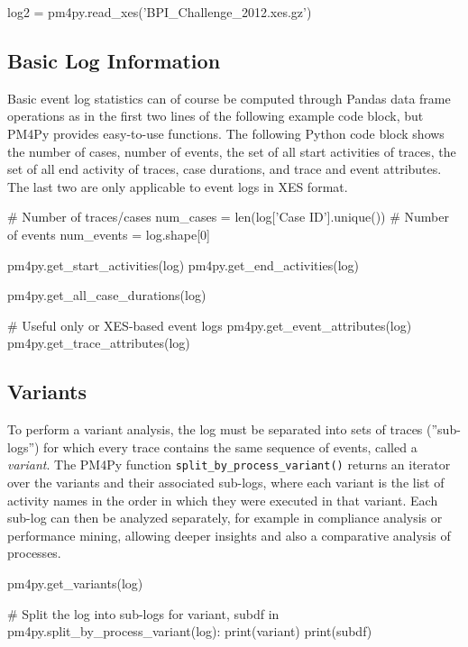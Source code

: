\begin{pythoncode}
log2 = pm4py.read_xes('BPI_Challenge_2012.xes.gz')
\end{pythoncode}

\subsection*{Basic Log Information}

Basic event log statistics can of course be computed through Pandas data frame operations as in the first two lines of the following example code block, but PM4Py provides easy-to-use functions. The following Python code block shows the number of cases, number of events, the set of all start activities of traces, the set of all end activity of traces, case durations, and trace and event attributes. The last two are only applicable to event logs in XES format.

\begin{samepage}
\begin{pythoncode}
# Number of traces/cases
num_cases = len(log['Case ID'].unique())
# Number of events
num_events = log.shape[0]

pm4py.get_start_activities(log)
pm4py.get_end_activities(log)

pm4py.get_all_case_durations(log)

# Useful only or XES-based event logs
pm4py.get_event_attributes(log)
pm4py.get_trace_attributes(log)
\end{pythoncode}
\end{samepage}

\subsection*{Variants}

To perform a variant analysis, the log must be separated into sets of traces (''sub-logs'') for which every trace contains the same sequence of events, called a \emph{variant}. The PM4Py function \texttt{split\_by\_process\_variant()} returns an iterator over the variants and their associated sub-logs, where each variant is the list of activity names in the order in which they were executed in that variant. Each sub-log can then be analyzed separately, for example in compliance analysis or performance mining, allowing deeper insights and also a comparative analysis of processes.

\begin{samepage}
\begin{pythoncode}
pm4py.get_variants(log)

# Split the log into sub-logs
for variant, subdf in pm4py.split_by_process_variant(log):
    print(variant)
    print(subdf)  
\end{pythoncode}
\end{samepage}


